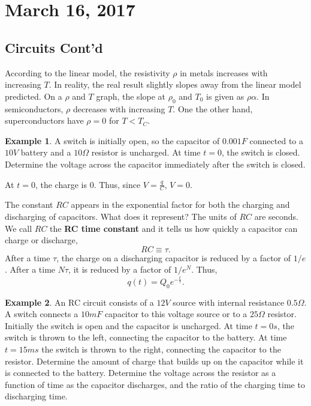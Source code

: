 \documentclass[11pt]{article}
\theoremstyle{plain} %
\theoremstyle{definition}
\theoremstyle{example}
\newtheorem*{example}{Example}
\theoremstyle{remark}
\begin{document}
\section{March 16, 2017}
\subsection{Circuits Cont'd}

According to the linear model, the resistivity $\rho$ in metals increases with increasing $T$. In reality, the real result slightly slopes away from the linear model predicted. On a $\rho$ and $T$ graph, the slope at $\rho_0$ and $T_0$ is given as $\rho\alpha$. In semiconductors, $\rho$ decreases with increasing $T$. One the other hand, superconductors have $\rho=0$ for $T < T_C$. 

\begin{example}
A switch is initially open, so the capacitor of $0.001F$ connected to a $10V$ battery and a $10\Omega$ resistor is uncharged. At time $t=0$, the switch is closed. Determine the voltage across the capacitor immediately after the switch is closed. 
\end{example}

At $t=0$, the charge is 0. Thus, since $V = \frac{q}{C}$, $V = 0$. 

The constant $RC$ appears in the exponential factor for both the charging and discharging of capacitors. What does it represent? The units of $RC$ are seconds. We call $RC$ the \textbf{RC time constant} and it tells us how quickly a capacitor can charge or discharge,
$$RC \equiv \tau.$$
After a time $\tau$, the charge on a discharging capacitor is reduced by a factor of $1/e$. After a time $N\tau$, it is reduced by a factor of $1/e^N$. Thus,
$$q(t) = Q_0e^{-\frac{t}{\tau}}.$$

\begin{example} An RC circuit consists of a $12V$ source with internal resistance $0.5\Omega$. A switch connects a $10mF$ capacitor to this voltage source or to a $25\Omega$ resistor. Initially the switch is open and the capacitor is uncharged. At time $t = 0s$, the switch is thrown to the left, connecting the capacitor to the battery. At time $t = 15 ms$ the switch is thrown to the right, connecting the capacitor to the resistor. Determine the amount of charge that builds up on the capacitor while it is connected to the battery. Determine the voltage across the resistor as a function of time as the capacitor discharges, and the ratio of the charging time to discharging time.
\end{example}
\end{document}
